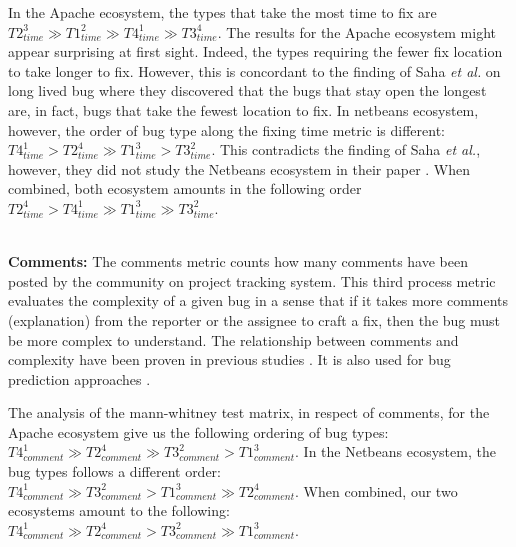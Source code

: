 In the Apache ecosystem, the types that take the most time to fix are  $T2_{time}^3
 \gg T1_{time}^2
 \gg T4_{time}^1
 \gg T3_{time}^4
$.
The results for the Apache ecosystem might appear surprising at first sight.
Indeed, the types requiring the fewer fix location to take longer to fix.
However, this is concordant to the finding of Saha {\it et al.} on long lived bug \cite{Saha2014} where they discovered that the bugs that stay open the longest are, in fact, bugs that take the fewest location to fix.
In netbeans ecosystem, however, the order of bug type along the fixing time metric is different: $T4_{time}^1
 > T2_{time}^4
 \gg T1_{time}^3
 > T3_{time}^2
$.
This contradicts the finding of Saha {\it et al.}, however, they did not study the Netbeans ecosystem in their paper \cite{Saha2014}.
When combined, both ecosystem amounts in the following order
$
T2_{time}^4
 >
T4_{time}^1
 \gg
T1_{time}^3
 \gg
T3_{time}^2
$.

\\ \vspace{0.1cm} {\bf Comments: }
The comments metric counts how many comments have been posted by the community on project tracking system.
This third process metric evaluates the complexity of a given bug in a sense that if it takes more comments (explanation) from the reporter or the assignee to craft a fix, then the bug must be more complex to understand.
The relationship between comments and complexity have been proven in previous studies \cite{Zhang2013,Zhang2012}.
It is also used for bug prediction approaches \cite{DAmbros2010,Bhattacharya2011}.

The analysis of the mann-whitney test matrix, in respect of comments, for the Apache ecosystem give us the following ordering of bug types:
$
T4_ {comment} ^1
 \gg
T2_{comment}^4
 \gg
T3_{comment}^2
 >
T1_{comment}^3
$.
In the Netbeans ecosystem, the bug types follows a different order:
$
T4_{comment}^1
 \gg
T3_{comment}^2
 >
T1_{comment}^3
 \gg
T2_{comment}^4
$.
When combined, our two ecosystems amount to the following:
$
T4_{comment}^1
 \gg
T2_{comment}^4
 >
T3_{comment}^2
 \gg
T1_{comment}^3
$.

